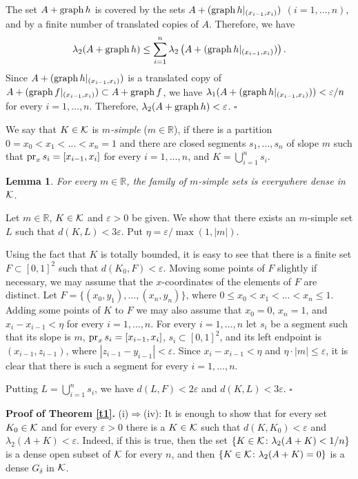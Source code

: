 \documentclass[12pt]{article}
\newtheorem{lemma}[theorem]{Lemma}
\def\rr{{\mathbb R}}
\def\kk{{\cal K}}
\def\su{\subset}
\def\de{\delta}
\def\ep{\varepsilon}
\def\la{\lambda}
\def\cd{\cdot}
\def\stb{,\ldots ,}
\def\nl{[0,1]}
\def\proof{\noindent {\bf Proof.} }
\def\graph{{\rm graph}\, }
\def\pr{{\rm pr}_x \, }
\def\akkor{\Longrightarrow}
\begin{document}
The set $A+\graph h$ is covered by the sets $A+(\graph h|_{(x_{i-1},x_i )})$
$(i=1\stb n)$, and by a finite number of translated copies of $A$. Therefore,
we have
$$\la _2 (A+\graph h) \le \sum_{i=1}^n \la _2 \left( A+(\graph h|_{(x_{i-1},x_i )})
\right) .$$
Since $A+(\graph h|_{(x_{i-1},x_i )})$ is a translated copy of
$A+(\graph f|_{(x_{i-1},x_i )}) \su A+\graph f$, we have 
$\la _1 (A+(\graph h|_{(x_{i-1},x_i )} ))<\ep /n$ for every $i=1\stb n$. Therefore,
$\la _2 ( A+\graph h)<\ep$. \hfill $\square$

We say that $K\in \kk$ is {\it $m$-simple} ($m\in \rr$), if there is a partition
$0=x_0 <x_1 <\ldots < x_n =1$ and there are closed segments $s_1 \stb s_n$ of
slope $m$ such that $\pr s_i =[x_{i-1},x_i ]$ for every $i=1\stb n$, and
$K=\bigcup_{i=1}^n s_i$.
\begin{lemma} \label{l3}
For every $m\in \rr$, the family of $m$-simple sets is everywhere dense in
$\kk$.
\end{lemma}
\proof
Let $m\in \rr$, $K\in \kk$ and $\ep >0$ be given. We show that there
exists an $m$-simple set $L$ such that $d(K,L)<3\ep$. Put $\eta =\ep /\max (1,
|m|)$.

Using the fact that $K$ is totally bounded, it is easy to see that there is a
finite set $F\su \nl ^2$ such that $d(K_0 ,F)<\ep$. Moving some points of $F$
slightly if necessary, we may assume that the $x$-coordinates of the
elements of $F$ are distinct. Let $F=\{ (x_0 ,y_1 ) \stb (x_n ,y_n ) \}$, where
$0\le x_0 <x_1 <\ldots <x_n \le 1$. Adding some points of $K$ to $F$ we may also
assume that $x_0 =0$, $x_n =1$, and $x_i -x_{i-1} < \eta$ for every $i=1\stb n$.
For every $i=1\stb n$ let $s_i$ be a segment such that its slope is $m$,
$\pr s_i =[x_{i-1} ,x_i ]$, $s_i \su \nl ^2$, and its left endpoint is $(x_{i-1} ,
z_{i-1})$, where $|z_{i-1} -y_{i-1}|<\ep$. Since $x_i -x_{i-1} < \eta$ and
$\eta \cd |m|\le \ep$, it is clear that there is such a segment for every
$i=1\stb n$.

Putting $L=\bigcup_{i=1}^{n} s_i$, we have $d(L,F)<2\ep$ and
$d(K,L)<3\ep$. \hfill $\square$

{\bf Proof of Theorem \ref{t1}.}
(i)$\akkor$(iv): It is enough to show that for every set $K_0 \in \kk$ and
for every $\ep >0$ there is a $K\in \kk$ such that $d(K,K_0 )<\ep$ and
$\la _2 (A+K) <\ep$. Indeed, if this is true, then the set $\{ K\in \kk \colon
\la _2 (A+K)<1/n\}$ is a dense open subset of $\kk$ for every $n$,
and then $\{ K\in \kk \colon \la _2 (A+K)=0\}$ is a dense $G_\de$ in $\kk$.
\end{document}
